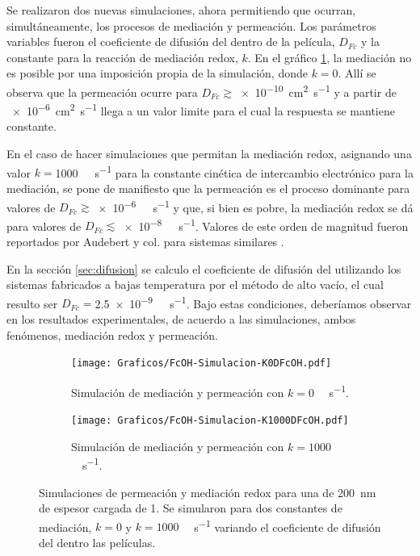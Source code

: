 		Se realizaron dos nuevas simulaciones, ahora permitiendo que ocurran, simultáneamente, los procesos de mediación y permeación. Los parámetros variables fueron el coeficiente de difusión del \fc\space dentro de la película, $D_{Fc}$ y la constante para la reacción de mediación redox, $k$. En el gráfico \ref{fig:sim_med_k0}, la mediación no es posible por una imposición propia de la simulación, donde $k\!=\!0$. Allí se observa que la permeación ocurre para $D_{Fc}\!\!\gtrsim$\SI{e-10}{\square\cm\per\second} y a partir de \SI{e-6}{\square\cm\per\second} llega a un valor limite para el cual la respuesta se mantiene constante.

		\pagebreak

		En el caso de hacer simulaciones que permitan la mediación redox, asignando una valor $k\!=$\SI{1000}{\per\Molar\per\second} para la constante cinética de intercambio electrónico para la mediación, se pone de manifiesto que la permeación es el proceso dominante para valores de $D_{Fc}\!\gtrsim$\SI{e-6}{\per\Molar\per\second} y que, si bien es pobre, la mediación redox se dá para valores de $D_{Fc}\!\!\lesssim$\SI{e-8}{\per\Molar\per\second}. Valores de este orden de magnitud fueron reportados por Audebert y col. para sistemas similares\cite{Audebert2015} .

		En la sección \ref{sec:difusion} se calculo el coeficiente de difusión del \fc\space utilizando los sistemas fabricados a bajas temperatura por el método de alto vacío, el cual resulto ser $D_{Fc}\!\!=$\SI{2.5e-9}{\per\Molar\per\second}. Bajo estas condiciones, deberíamos observar en los resultados experimentales, de acuerdo a las simulaciones, ambos fenómenos, mediación redox y permeación. 
			
			\begin{figure}[ht]
				\begin{subfigure}[t]{0.495\textwidth}
					\centering
			 	    \texttt{[image: Graficos/FcOH-Simulacion-K0DFcOH.pdf]}
			        \vspace*{-4mm}
			        \caption{Simulación de mediación y permeación con $k=0$ \si{\per\Molar\per\second}.}
			        \label{fig:sim_med_k0}
			      	\end{subfigure}
				\begin{subfigure}[t]{0.495\textwidth}
					\centering
			 	    \texttt{[image: Graficos/FcOH-Simulacion-K1000DFcOH.pdf]}
			        \vspace*{-4mm}
			        \caption{Simulación de mediación y permeación con $k=1000$ \si{\per\Molar\per\second}.}
			        \label{fig:sim_med_1000}
			      	\end{subfigure}
			      	\vspace*{-1mm}
			      	\caption[Simulación EQ de mediación/permeación]{Simulaciones de permeación y mediación redox para una \pdm\space de \SI{200}{nm} de espesor cargada de \ru\space \SI{1}{\Molar}. Se simularon para dos constantes de mediación, $k=0$ y $k=1000$ \si{\per\Molar\per\second} variando el coeficiente de difusión del \fc\space dentro las películas.}
			      	\label{fig:sim_med_perm}
			      	\end{figure}
			  	
